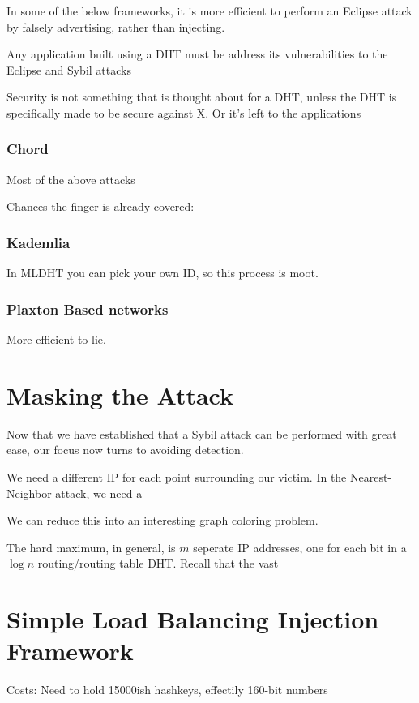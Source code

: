 \documentclass[10pt,a4paper]{article}
\begin{document}
In some of the below frameworks, it is more efficient to perform an Eclipse attack by falsely advertising, rather than injecting.






Any application built using a DHT must be address its vulnerabilities to the Eclipse and Sybil attacks

Security is not something that is thought about for a DHT, unless the 
DHT is specifically made to be secure against X.  
Or it's left to the applications



\subsubsection{Chord}
Most of the above attacks



Chances the finger is already covered:

\subsubsection{Kademlia}
In MLDHT you can pick your own ID, so this process is moot.

\subsubsection{Plaxton Based networks}
More efficient to lie.


\section{Masking the Attack}
Now that we have established that a Sybil attack can be performed with great ease, our focus now turns to avoiding detection.

We need a different IP for each point surrounding our victim.  In the Nearest-Neighbor attack, we need a 

We can reduce this into an interesting graph coloring problem.


The hard maximum, in general, is $m$ seperate IP addresses, one for each bit in a $\log n$ routing/routing table DHT.
Recall that the vast


\section{Simple Load Balancing Injection Framework}

Costs:  Need to hold 15000ish hashkeys, effectily 160-bit numbers



\end{document}
